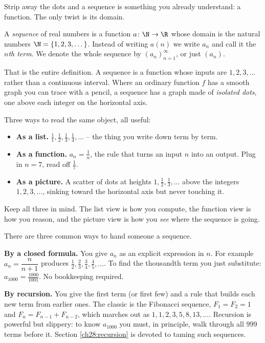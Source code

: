 Strip away the dots and a sequence is something you already understand: a
function. The only twist is its domain.

\begin{definition}[Sequence]
\label{ch28:def-sequence}
A \emph{sequence} of real numbers is a function $a \colon \N \to \R$ whose
domain is the natural numbers $\N = \{1, 2, 3, \dots\}$. Instead of writing
$a(n)$ we write $a_n$ and call it the \emph{$n$th term}. We denote the whole
sequence by $(a_n)_{n=1}^{\infty}$, or just $(a_n)$.
\end{definition}

That is the entire definition. A sequence is a function whose inputs are
$1, 2, 3, \dots$ rather than a continuous interval. Where an ordinary function
$f$ has a smooth graph you can trace with a pencil, a sequence has a graph made
of \emph{isolated dots}, one above each integer on the horizontal axis.

\begin{intuitionbox}
Three ways to read the same object, all useful:
\begin{itemize}
  \item \textbf{As a list.} $\tfrac11, \tfrac12, \tfrac13, \tfrac14, \dots$ --
        the thing you write down term by term.
  \item \textbf{As a function.} $a_n = \tfrac1n$, the rule that turns an input
        $n$ into an output. Plug in $n=7$, read off $\tfrac17$.
  \item \textbf{As a picture.} A scatter of dots at heights
        $1, \tfrac12, \tfrac13, \dots$ above the integers $1, 2, 3, \dots$,
        sinking toward the horizontal axis but never touching it.
\end{itemize}
Keep all three in mind. The list view is how you compute, the function view is
how you reason, and the picture view is how you \emph{see} where the sequence is
going.
\end{intuitionbox}

There are three common ways to hand someone a sequence.

\textbf{By a closed formula.} You give $a_n$ as an explicit expression in $n$.
For example $a_n = \dfrac{n}{n+1}$ produces $\tfrac12, \tfrac23, \tfrac34,
\tfrac45, \dots$. To find the thousandth term you just substitute: $a_{1000} =
\tfrac{1000}{1001}$. No bookkeeping required.

\textbf{By recursion.} You give the first term (or first few) and a rule that
builds each new term from earlier ones. The classic is the Fibonacci sequence,
$F_1 = F_2 = 1$ and $F_{n} = F_{n-1} + F_{n-2}$, which marches out as $1, 1, 2,
3, 5, 8, 13, \dots$. Recursion is powerful but slippery: to know $a_{1000}$ you
must, in principle, walk through all $999$ terms before it. Section
\ref{ch28:recursion} is devoted to taming such sequences.

